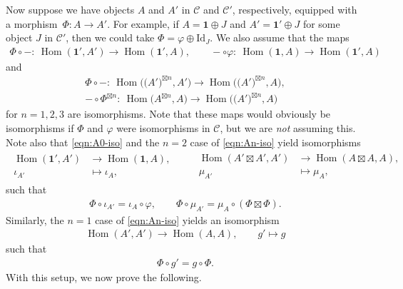 \documentclass[pdftex]{sigma}
\numberwithin{equation}{section}
\theoremstyle{definition}
\begin{document}
Now suppose we have objects $A$ and $A'$ in $\mathcal{C}$ and $\mathcal{C}'$, respectively, equipped with a morphism~${\Phi\colon A\rightarrow A'}$. For example, if $A=\mathbf{1}\oplus J$ and $A'=\mathbf{1}'\oplus J$ for some object $J$ in $\mathcal{C}'$, then we could take $\Phi=\varphi\oplus\mathrm{Id}_J$. We also assume that the maps
\begin{gather}\label{eqn:A0-iso}
\Phi\circ -\colon\ \operatorname{Hom}(\mathbf{1}',A')\longrightarrow\operatorname{Hom}(\mathbf{1}',A),\qquad -\circ\varphi\colon\ \operatorname{Hom}(\mathbf{1},A)\longrightarrow\operatorname{Hom}(\mathbf{1}',A)
\end{gather}
and
\begin{gather}
\Phi\circ -\colon\ \operatorname{Hom}\bigl(\bigl(A'\bigr)^{\boxtimes n},A'\bigr)\longrightarrow\operatorname{Hom}\bigl(\bigl(A'\bigr)^{\boxtimes n},A\bigr),\nonumber\\ -\circ\Phi^{\boxtimes n}\colon\ \operatorname{Hom}\bigl(A^{\boxtimes n},A\bigr)\longrightarrow\operatorname{Hom}\bigl(\bigl(A'\bigr)^{\boxtimes n},A\bigr)\label{eqn:An-iso}
\end{gather}
for $n=1,2,3$ are isomorphisms. Note that these maps would obviously be isomorphisms if $\Phi$ and $\varphi$ were isomorphisms in $\mathcal{C}$, but we are \textit{not} assuming this. Note also that \eqref{eqn:A0-iso} and the $n=2$ case of \eqref{eqn:An-iso} yield isomorphisms
\begin{align*}
\begin{aligned}
\operatorname{Hom}(\mathbf{1}',A') & \longrightarrow\operatorname{Hom}(\mathbf{1},A),\\
\iota_{A'} & \longmapsto \iota_A,
\end{aligned}\qquad
\begin{aligned}
 \operatorname{Hom}(A'\boxtimes A',A') & \longrightarrow\operatorname{Hom}(A\boxtimes A,A),\\
\mu_{A'} & \longmapsto \mu_A,
\end{aligned}
\end{align*}
such that
\begin{gather}\label{eqn:A'-A-structure-reln}
\Phi\circ\iota_{A'} =\iota_A\circ\varphi,\qquad \Phi\circ\mu_{A'} =\mu_A\circ(\Phi\boxtimes\Phi).
\end{gather}
Similarly, the $n=1$ case of \eqref{eqn:An-iso} yields an isomorphism
\begin{gather*}
\operatorname{Hom}(A',A') \longrightarrow\operatorname{Hom}(A,A),\qquad
g' \longmapsto g
\end{gather*}
such that
\begin{gather}\label{eqn:g'-g-reln}
\Phi\circ g' = g\circ\Phi.
\end{gather}
With this setup, we now prove the following.
\end{document}
